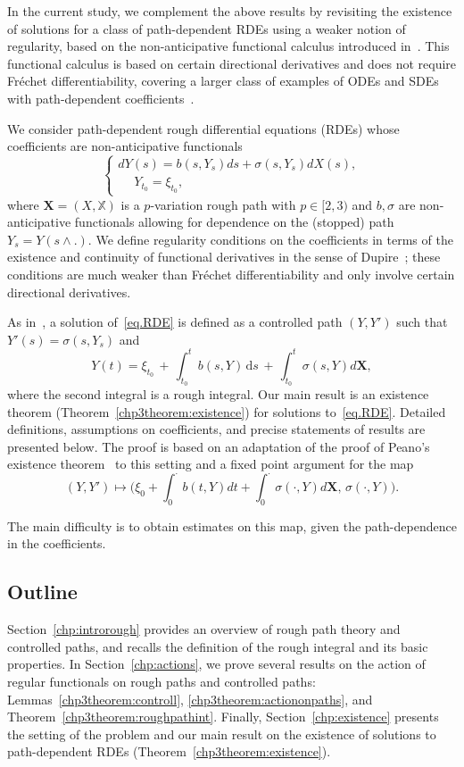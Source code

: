 \documentclass[10pt]{amsart}
\theoremstyle{definition}\newtheorem{defi}[theo]{Definition}\newtheorem{rema}[theo]{Remark}\newtheorem{exam}[theo]{Example}\newtheorem{exem}[theo]{Example}\newtheorem{nota}[theo]{Notation}
\renewcommand*\d{\mathrm{d}}
\newcommand{\bbX}{\mathbb{X}}
\begin{document}
In the current study, we complement the above results by revisiting the existence of solutions for a class of path-dependent RDEs using a weaker notion of regularity, based on the non-anticipative functional calculus introduced in~\cite{CF09, cont2012, D09}. This functional calculus is based on certain directional derivatives and does not require Fréchet differentiability, covering a larger class of examples of ODEs and SDEs with path-dependent coefficients~\cite{ContKalinin}.

We consider path-dependent rough differential equations (RDEs) whose coefficients are non-anticipative functionals
\begin{equation}\label{eq.RDE}
\begin{cases}
dY(s)= b(s, Y_s)ds+\sigma(s,Y_s)dX (s),
\\
\quad\; Y_{t_0}=\xi_{t_0},
\end{cases}
\end{equation}
where $\bm{X}=(X,\bbX)$ is a $p$-variation rough path with $p\in[2,3)$ and $b,\sigma$ are non-anticipative functionals allowing for dependence on the (stopped) path $Y_s=Y(s\wedge.)$. We define regularity conditions on the coefficients in terms of the existence and continuity of functional derivatives in the sense of Dupire~\cite{cont2012, D09}; these conditions are much weaker than Fréchet differentiability and only involve certain directional derivatives.

As in~\cite{frizhairer}, a solution of~\eqref{eq.RDE} is defined as a controlled path $(Y, Y')$ such that $Y'(s)=\sigma(s,Y_s)$ and
\[
Y(t)=\xi_{t_0}\,+\, \int_{t_0}^t b(s, Y)\, \d s\,+\,\int_{t_0}^t \sigma(s, Y) d\bm{X},
\]
where the second integral is a rough integral. Our main result is an existence theorem (Theorem~\ref{chp3theorem:existence}) for solutions to~\eqref{eq.RDE}. Detailed definitions, assumptions on coefficients, and precise statements of results are presented below. The proof is based on an adaptation of the proof of Peano's existence theorem~\cite{peano} to this setting and a fixed point argument for the map
\[
\left(Y, Y'\right)\mapsto \Big(\xi_0+\int_0^{\cdot} b(t, Y)dt+\int_0^{\cdot} \sigma(\cdot, Y) d\bm{X},\, \sigma(\cdot, Y) \Big).
\]

The main difficulty is to obtain estimates on this map, given the path-dependence in the coefficients.

\subsection*{Outline} 
Section~\ref{chp:introrough} provides an overview of rough path theory and controlled paths, and recalls the definition of the rough integral and its basic properties. In Section~\ref{chp:actions}, we prove several results on the action of regular functionals on rough paths and controlled paths: Lemmas~\ref{chp3theorem:controll}, \ref{chp3theorem:actiononpaths}, and Theorem~\ref{chp3theorem:roughpathint}. Finally, Section~\ref{chp:existence} presents the setting of the problem and our main result on the existence of solutions to path-dependent RDEs (Theorem~\ref{chp3theorem:existence}).
\end{document}
